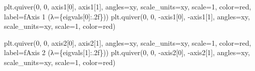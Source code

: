 \documentclass[
  letterpaper,
  DIV=11,
  numbers=noendperiod]{scrreprt}
\newenvironment{Shaded}{\begin{snugshade}}{\end{snugshade}}
\newcommand{\DecValTok}[1]{\textcolor[rgb]{0.68,0.00,0.00}{#1}}
\newcommand{\NormalTok}[1]{\textcolor[rgb]{0.00,0.23,0.31}{#1}}
\newcommand{\OperatorTok}[1]{\textcolor[rgb]{0.37,0.37,0.37}{#1}}
\newcommand{\SpecialCharTok}[1]{\textcolor[rgb]{0.37,0.37,0.37}{#1}}
\newcommand{\SpecialStringTok}[1]{\textcolor[rgb]{0.13,0.47,0.30}{#1}}
\newcommand{\StringTok}[1]{\textcolor[rgb]{0.13,0.47,0.30}{#1}}
\begin{document}
\begin{Shaded}
\begin{Highlighting}[]
\NormalTok{plt.quiver(}\DecValTok{0}\NormalTok{, }\DecValTok{0}\NormalTok{, axis1[}\DecValTok{0}\NormalTok{], axis1[}\DecValTok{1}\NormalTok{], angles}\OperatorTok{=}\StringTok{\textquotesingle{}xy\textquotesingle{}}\NormalTok{, scale\_units}\OperatorTok{=}\StringTok{\textquotesingle{}xy\textquotesingle{}}\NormalTok{, scale}\OperatorTok{=}\DecValTok{1}\NormalTok{, color}\OperatorTok{=}\StringTok{\textquotesingle{}red\textquotesingle{}}\NormalTok{, label}\OperatorTok{=}\SpecialStringTok{f\textquotesingle{}Axis 1 (λ=}\SpecialCharTok{\{}\NormalTok{eigvals[}\DecValTok{0}\NormalTok{]}\SpecialCharTok{:.2f\}}\SpecialStringTok{)\textquotesingle{}}\NormalTok{)}
\NormalTok{plt.quiver(}\DecValTok{0}\NormalTok{, }\DecValTok{0}\NormalTok{, }\OperatorTok{{-}}\NormalTok{axis1[}\DecValTok{0}\NormalTok{], }\OperatorTok{{-}}\NormalTok{axis1[}\DecValTok{1}\NormalTok{], angles}\OperatorTok{=}\StringTok{\textquotesingle{}xy\textquotesingle{}}\NormalTok{, scale\_units}\OperatorTok{=}\StringTok{\textquotesingle{}xy\textquotesingle{}}\NormalTok{, scale}\OperatorTok{=}\DecValTok{1}\NormalTok{, color}\OperatorTok{=}\StringTok{\textquotesingle{}red\textquotesingle{}}\NormalTok{)}

\NormalTok{plt.quiver(}\DecValTok{0}\NormalTok{, }\DecValTok{0}\NormalTok{, axis2[}\DecValTok{0}\NormalTok{], axis2[}\DecValTok{1}\NormalTok{], angles}\OperatorTok{=}\StringTok{\textquotesingle{}xy\textquotesingle{}}\NormalTok{, scale\_units}\OperatorTok{=}\StringTok{\textquotesingle{}xy\textquotesingle{}}\NormalTok{, scale}\OperatorTok{=}\DecValTok{1}\NormalTok{, color}\OperatorTok{=}\StringTok{\textquotesingle{}red\textquotesingle{}}\NormalTok{, label}\OperatorTok{=}\SpecialStringTok{f\textquotesingle{}Axis 2 (λ=}\SpecialCharTok{\{}\NormalTok{eigvals[}\DecValTok{1}\NormalTok{]}\SpecialCharTok{:.2f\}}\SpecialStringTok{)\textquotesingle{}}\NormalTok{)}
\NormalTok{plt.quiver(}\DecValTok{0}\NormalTok{, }\DecValTok{0}\NormalTok{, }\OperatorTok{{-}}\NormalTok{axis2[}\DecValTok{0}\NormalTok{], }\OperatorTok{{-}}\NormalTok{axis2[}\DecValTok{1}\NormalTok{], angles}\OperatorTok{=}\StringTok{\textquotesingle{}xy\textquotesingle{}}\NormalTok{, scale\_units}\OperatorTok{=}\StringTok{\textquotesingle{}xy\textquotesingle{}}\NormalTok{, scale}\OperatorTok{=}\DecValTok{1}\NormalTok{, color}\OperatorTok{=}\StringTok{\textquotesingle{}red\textquotesingle{}}\NormalTok{)}


\end{Highlighting}
\end{Shaded}
\end{document}
